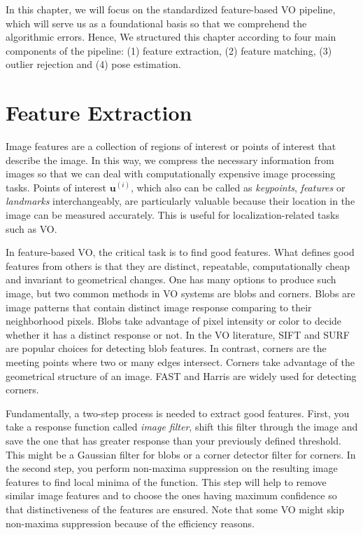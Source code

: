 \documentclass[a4paper]{report}
\numberwithin{figure}{section}
\begin{document}
In this chapter, we will focus on the standardized feature-based VO pipeline, 
which will serve us as a foundational basis so that we comprehend the 
algorithmic errors. Hence, We structured this chapter according to four main 
components of the pipeline: (1) feature extraction, (2) feature matching, (3) 
outlier rejection and (4) pose estimation. 


\section{Feature Extraction} \label{sc_feature_extraction}

Image features are a collection of regions of interest or points of interest 
that describe the image. In this way, we compress the necessary information 
from images so that we can deal with computationally expensive image 
processing tasks. Points of interest $\mathbf{u}^{(i)}$, which also can be 
called as 
\textit{keypoints}, \textit{features} or \textit{landmarks} interchangeably, 
are particularly valuable because their location in the image can be measured 
accurately. This is useful for localization-related tasks such as VO. 

In feature-based VO, the critical task is to find good features.  What defines 
good features from others is that they are distinct, repeatable, 
computationally cheap and invariant to geometrical changes.  One has many 
options to produce such image, but two common methods in VO systems are blobs 
and corners.  Blobs are image patterns that contain distinct image response 
comparing to their neighborhood pixels. Blobs take advantage of pixel 
intensity or color to decide whether it has a distinct response or not.  In 
the VO literature, SIFT \parencite{Lowe2004} and SURF \parencite{Bay2008} are 
popular 
choices for detecting blob features.  In contrast, corners are the meeting 
points where two or many edges intersect.  Corners take advantage of the 
geometrical structure of an image.  FAST \parencite{Rosten2006} and Harris 
\parencite{Harris1988} are widely used for detecting corners.

Fundamentally, a two-step process is needed to extract good features.  First, 
you take a response function called \textit{image filter}, shift this filter 
through the image and save the one that has greater response than your 
previously defined threshold.  This might be a Gaussian filter for blobs or a 
corner detector filter for corners. In the second step, you perform non-maxima 
suppression on the resulting image features to find local minima of the 
function.  This step will help to remove similar image features and to choose 
the ones having maximum confidence so that distinctiveness of the features are 
ensured.  Note that some VO might skip non-maxima suppression because of the 
efficiency 
reasons.
\end{document}
